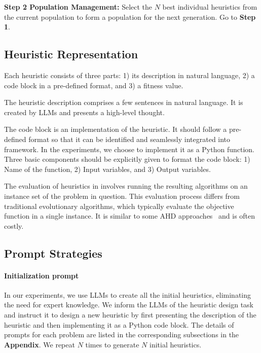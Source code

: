 \textbf{Step 2 Population Management:} Select the $N$ best individual heuristics from the current population to form a population for the next generation. Go to \textbf{Step 1}.  




\subsection{Heuristic Representation}
Each heuristic consists of three parts: 1) its description in natural language, 2) a code block in a pre-defined format, and 3) a fitness value.

The heuristic description comprises a few sentences in natural language. It is created by LLMs and presents a high-level thought.

The code block is an implementation of the heuristic. It should follow a pre-defined format so that it can be identified and seamlessly integrated into \ourmethod{} framework. In the experiments, we choose to implement it as a Python function. Three basic components should be explicitly given to format the code block: 1) Name of the function, 2) Input variables, and 3) Output variables.

The evaluation of heuristics in \ourmethod{} involves running the resulting algorithms on an instance set of the problem in question. This evaluation process differs from traditional evolutionary algorithms, which typically evaluate the objective function in a single instance. It is similar to some AHD approaches~\cite{lopez2016irace,hutter2011sequential} and is often costly. 


\subsection{Prompt Strategies}

\paragraph{Initialization prompt}

In our experiments, we use LLMs to create all the initial heuristics, eliminating the need for expert knowledge. We inform the LLMs of the heuristic design task and instruct it to design a new heuristic by first presenting the description of the heuristic and then implementing it as a Python code block. The details of prompts for each problem are listed in the corresponding subsections in the \textbf{Appendix}. We repeat $N$ times to generate $N$ initial heuristics. 

